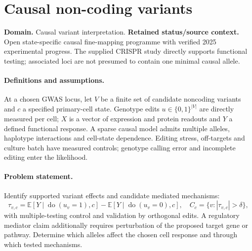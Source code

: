 \documentclass[11pt]{article}
\begin{document}
\section*{Causal non-coding variants}
\label{prob:027}
\label{rank:55}
\par\smallskip

\noindent\textbf{Domain.} Causal variant interpretation. \quad \textbf{Retained status/source context.} Open state-specific causal fine-mapping programme with verified 2025 experimental progress. The supplied CRISPR study directly supports functional testing; associated loci are not presumed to contain one minimal causal allele.
\paragraph{Definitions and assumptions.} At a chosen GWAS locus, let $V$ be a finite set of candidate noncoding variants and $c$ a specified primary-cell state. Genotype edits $u\in\{0,1\}^{|V|}$ are directly measured per cell; $X$ is a vector of expression and protein readouts and $Y$ a defined functional response. A sparse causal model admits multiple alleles, haplotype interactions and cell-state dependence. Editing stress, off-targets and culture batch have measured controls; genotype calling error and incomplete editing enter the likelihood.
\paragraph{Problem statement.} Identify supported variant effects and candidate mediated mechanisms:
\[
\tau_{v,c}=\mathbb{E}[Y\mid\operatorname{do}(u_v=1),c]-\mathbb{E}[Y\mid\operatorname{do}(u_v=0),c],
\quad C_c=\{v:|\tau_{v,c}|>\delta\},
\]
with multiple-testing control and validation by orthogonal edits. A regulatory mediator claim additionally requires perturbation of the proposed target gene or pathway. Determine which alleles affect the chosen cell response and through which tested mechanisms.
\end{document}
